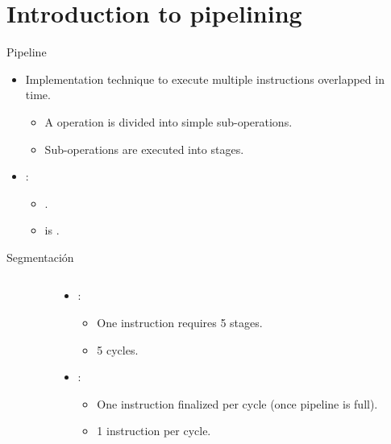 \section{Introduction to pipelining}

\begin{frame}[t]{Pipeline}
\begin{itemize}
  \item Implementation technique to execute multiple instructions
        overlapped in time.
    \begin{itemize}
      \item A  operation is divided into
            simple sub-operations.
      \item Sub-operations are executed into stages.
    \end{itemize}
  \item {}:
    \begin{itemize}
      \item {} .
      \item {} is .
    \end{itemize}
\end{itemize}
\end{frame}

\begin{frame}[t,fragile]{Segmentación}
\begin{columns}[T]
\begin{column}{0.6\textwidth}

\end{column}

\pause
\begin{column}[t]{.4\textwidth}
\begin{itemize}
  \item {}:
    \begin{itemize}
      \item One instruction requires 5 stages.
      \item 5 cycles.
    \end{itemize}
  \item {}:
    \begin{itemize}
      \item One instruction finalized per cycle (once pipeline is full).
      \item 1 instruction per cycle.
    \end{itemize}
\end{itemize}
\end{column}
\end{columns}
\end{frame}

